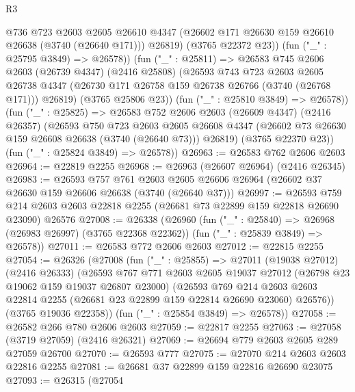 \begin{lexlean}{R3}
\begin{coremodule}
              @736
              @723
              @2603
              @2605
              @26610
              @4347
              (@26602 @171 @26630 @159 @26610 @26638 (@3740 (@26640 @171)))
              @26819)
            (@3765 @22372 @23))
          (fun ("_" : @25795 @3849) => @26578))
        (fun ("_" : @25811) =>
        @26583
          @745
          @2606
          @2603
          (@26739 @4347)
          (@2416 @25808)
          (@26593
            @743
            @723
            @2603
            @2605
            @26738
            @4347
            (@26730 @171 @26758 @159 @26738 @26766 (@3740 (@26768 @171)))
            @26819)
          (@3765 @25806 @23))
        (fun ("_" : @25810 @3849) => @26578))
      (fun ("_" : @25825) =>
      @26583
        @752
        @2606
        @2603
        (@26609 @4347)
        (@2416 @26357)
        (@26593
          @750
          @723
          @2603
          @2605
          @26608
          @4347
          (@26602 @73 @26630 @159 @26608 @26638 (@3740 (@26640 @73)))
          @26819)
        (@3765 @22370 @23))
      (fun ("_" : @25824 @3849) => @26578))
@26963 := @26583 @762 @2606 @2603
@26964 := @22819 @2255
@26968 := @26963 (@26607 @26964) (@2416 @26345)
@26983 := @26593
    @757
    @761
    @2603
    @2605
    @26606
    @26964
    (@26602 @37 @26630 @159 @26606 @26638 (@3740 (@26640 @37)))
@26997 := @26593
    @759
    @214
    @2603
    @2603
    @22818
    @2255
    (@26681 @73 @22899 @159 @22818 @26690 @23090)
    @26576
@27008 := @26338
    (@26960
      (fun ("_" : @25840) => @26968 (@26983 @26997) (@3765 @22368 @22362))
      (fun ("_" : @25839 @3849) => @26578))
@27011 := @26583 @772 @2606 @2603
@27012 := @22815 @2255
@27054 := @26326
    (@27008
      (fun ("_" : @25855) =>
      @27011
        (@19038 @27012)
        (@2416 @26333)
        (@26593
          @767
          @771
          @2603
          @2605
          @19037
          @27012
          (@26798 @23 @19062 @159 @19037 @26807 @23000)
          (@26593
            @769
            @214
            @2603
            @2603
            @22814
            @2255
            (@26681 @23 @22899 @159 @22814 @26690 @23060)
            @26576))
        (@3765 @19036 @22358))
      (fun ("_" : @25854 @3849) => @26578))
@27058 := @26582 @266 @780 @2606 @2603
@27059 := @22817 @2255
@27063 := @27058 (@3719 @27059) (@2416 @26321)
@27069 := @26694 @779 @2603 @2605 @289 @27059 @26700
@27070 := @26593 @777
@27075 := @27070 @214 @2603 @2603 @22816 @2255
@27081 := @26681 @37 @22899 @159 @22816 @26690 @23075
@27093 := @26315
    (@27054

\end{coremodule}
\end{lexlean}
